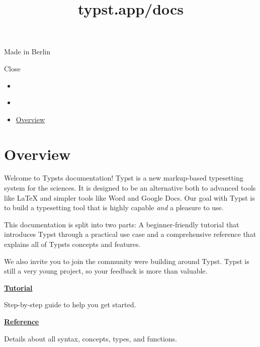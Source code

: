 Made in Berlin

\label{modal}
\pandocbounded{}

\label{md-insert}
Close

\pandocbounded{}


\title{typst.app/docs}

\begin{itemize}
\tightlist
\item
  \href{/docs}{}
\item
  
\item
  \href{/docs/}{Overview}
\end{itemize}

\section{Overview}\label{overview}

Welcome to Typst\textquotesingle s documentation! Typst is a new
markup-based typesetting system for the sciences. It is designed to be
an alternative both to advanced tools like LaTeX and simpler tools like
Word and Google Docs. Our goal with Typst is to build a typesetting tool
that is highly capable \emph{and} a pleasure to use.

This documentation is split into two parts: A beginner-friendly tutorial
that introduces Typst through a practical use case and a comprehensive
reference that explains all of Typst\textquotesingle s concepts and
features.

We also invite you to join the community we\textquotesingle re building
around Typst. Typst is still a very young project, so your feedback is
more than valuable.

\href{/docs/tutorial}{
\textbf{Tutorial}}

Step-by-step guide to help you get started.

\href{/docs/reference}{
\textbf{Reference}}

Details about all syntax, concepts, types, and functions.



